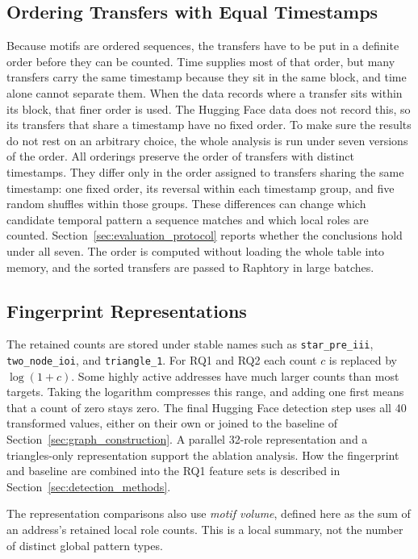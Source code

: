 \documentclass{thesisclass}
\begin{document}
\subsection{Ordering Transfers with Equal Timestamps}

Because motifs are ordered sequences, the transfers have to be put in a definite
order before they can be counted. Time supplies most of that order, but many
transfers carry the same timestamp because they sit in the same block, and time
alone cannot separate them. When the data records where a transfer sits within its
block, that finer order is used. The Hugging Face data does not record this, so its
transfers that share a timestamp have no fixed order. To make sure the results do
not rest on an arbitrary choice, the whole analysis is run under seven versions of
the order. All orderings preserve the order of transfers with distinct
timestamps. They differ only in the order assigned to transfers sharing the
same timestamp: one fixed order, its reversal within each timestamp group, and
five random shuffles within those groups. These differences can change which
candidate temporal pattern a sequence matches and which local roles are counted.
Section~\ref{sec:evaluation_protocol} reports whether the conclusions hold under
all seven. The order is computed without loading the whole table into memory, and
the sorted transfers are passed to Raphtory in large batches.

\subsection{Fingerprint Representations}

The retained counts are stored under stable names such as \texttt{star\_pre\_iii},
\texttt{two\_node\_ioi}, and \texttt{triangle\_1}. For RQ1 and RQ2 each count
$c$ is replaced by $\log(1+c)$. Some highly active addresses have much larger
counts than most targets.
Taking the logarithm compresses this range, and adding one first means that a
count of zero stays zero. The final Hugging Face detection step uses all 40
transformed values, either on their own or joined to the baseline of
Section~\ref{sec:graph_construction}. A parallel 32-role representation and a
triangles-only representation support the ablation analysis. How the fingerprint
and baseline are combined into the RQ1 feature sets is described in
Section~\ref{sec:detection_methods}.

The representation comparisons also use \emph{motif volume}, defined here as
the sum of an address's retained local role counts. This is a local summary,
not the number of distinct global pattern types.
\end{document}
